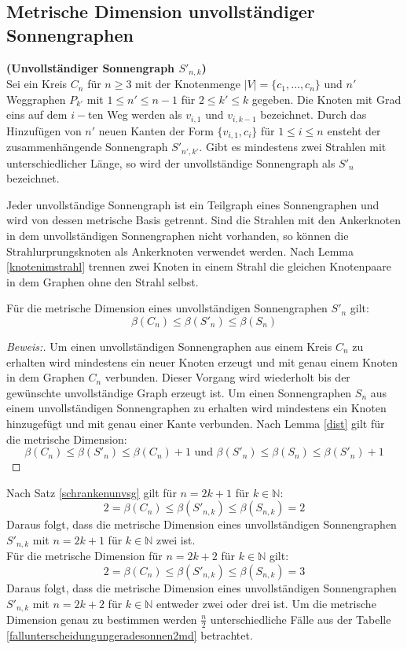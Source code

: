 \subsection{Metrische Dimension unvollständiger Sonnengraphen}  	
\label{chap_usonne} 
\begin{defi}{\textbf{(Unvollständiger Sonnengraph $S'_{n,k}$)}}\\
Sei ein Kreis $C_n$ für $n \geq 3$ mit der Knotenmenge $|V|=\{ c_1, \ldots , c_n \}$ und $n'$ Weggraphen $P_{k'}$ mit $1 \leq n' \leq n-1$ für $2 \leq k' \leq k$ gegeben. Die Knoten mit Grad eins auf dem $i-$ten Weg werden als $v_{i,1}$ und $v_{i,k-1}$ bezeichnet. Durch das Hinzufügen von $n'$ neuen Kanten der Form $\{v_{i,1},c_i\}$ für $1 \leq i \leq n$ ensteht der zusammenhängende Sonnengraph $S'_{n',k'}$. Gibt es mindestens zwei Strahlen mit unterschiedlicher Länge, so wird der unvollständige Sonnengraph als $S'_n$ bezeichnet. 
\end{defi}
\begin{bem}
Jeder unvollständige Sonnengraph ist ein Teilgraph eines Sonnengraphen und wird von dessen metrische Basis getrennt. Sind die Strahlen mit den Ankerknoten in dem unvollständigen Sonnengraphen nicht vorhanden, so können die Strahlurprungsknoten als Ankerknoten verwendet werden. Nach Lemma \ref{knotenimstrahl} trennen zwei Knoten in einem Strahl die gleichen Knotenpaare in dem Graphen ohne den Strahl selbst.
\end{bem}
\begin{satz}
\label{schrankenunvsg}
Für die metrische Dimension eines unvollständigen Sonnengraphen $S'_{n}$ gilt:
$$\beta(C_n) \leq \beta(S'_{n})\leq \beta(S_{n})$$
\end{satz}
\begin{proof}[Beweis:]
Um einen unvollständigen Sonnengraphen aus einem Kreis $C_n$ zu erhalten wird mindestens ein neuer Knoten erzeugt und mit genau einem Knoten in dem Graphen $C_n$ verbunden. Dieser Vorgang wird wiederholt bis der gewünschte unvollständige Graph erzeugt ist. Um einen Sonnengraphen $S_{n}$ aus einem unvollständigen Sonnengraphen zu erhalten wird mindestens ein Knoten hinzugefügt und mit genau einer Kante verbunden.%
Nach Lemma \ref{dist} gilt für die metrische Dimension:
$$\beta(C_n)  \leq \beta(S'_{n}) \leq \beta(C_n) +1 \text{ und } \beta(S'_{n}) \leq \beta(S_n) \leq \beta(S'_{n})+1$$
\end{proof}
\begin{bem}
Nach Satz \ref{schrankenunvsg} gilt für $n=2k+1$ für $k \in \mathbb{N}$: $$2=\beta(C_n) \leq \beta(S'_{n,k})\leq \beta(S_{n,k})=2$$
Daraus folgt, dass die metrische Dimension eines unvollständigen Sonnengraphen $S'_{n,k}$ mit $n=2k+1$ für $k \in \mathbb{N}$ zwei ist.\\
Für die metrische Dimension für $n=2k+2$ für $k \in \mathbb{N}$ gilt: $$2=\beta(C_n) \leq \beta(S'_{n,k})\leq \beta(S_{n,k})=3$$
Daraus folgt, dass die metrische Dimension eines unvollständigen Sonnengraphen $S'_{n,k}$ mit $n=2k+2$ für $k \in \mathbb{N}$ entweder zwei oder drei ist. Um die metrische Dimension genau zu bestimmen werden $\frac{n}{2}$ unterschiedliche Fälle aus der Tabelle \ref{fallunterscheidungungeradesonnen2md} betrachtet.
\end{bem}
